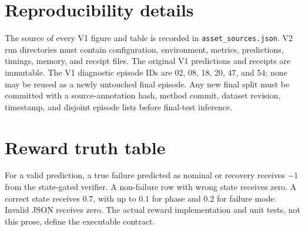 \section{Reproducibility details}
The source of every V1 figure and table is recorded in \texttt{asset\_sources.json}. V2 run directories must contain configuration, environment, metrics, predictions, timings, memory, and receipt files. The original V1 predictions and receipts are immutable. The V1 diagnostic episode IDs are 02, 08, 18, 20, 47, and 54; none may be reused as a newly untouched final episode. Any new final split must be committed with a source-annotation hash, method commit, dataset revision, timestamp, and disjoint episode lists before final-test inference.

\section{Reward truth table}
For a valid prediction, a true failure predicted as nominal or recovery receives $-1$ from the state-gated verifier. A non-failure row with wrong state receives zero. A correct state receives $0.7$, with up to $0.1$ for phase and $0.2$ for failure mode. Invalid JSON receives zero. The actual reward implementation and unit tests, not this prose, define the executable contract.
